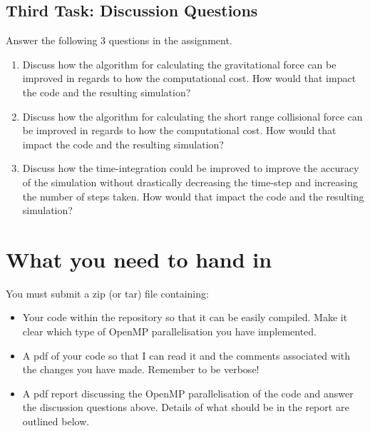 \documentclass[11pt]{amsart}
\begin{document}
\subsection{{\color{Red}Third Task}: Discussion Questions\nopunct\\}\label{sec:tasks:discussion}
Answer the following 3 questions in the assignment.
\begin{enumerate} 
  \item Discuss how the algorithm for calculating the gravitational force can be improved in regards to how the computational cost. How would that impact the code and the resulting simulation?
  \item Discuss how the algorithm for calculating the short range collisional force can be improved in regards to how the computational cost. How would that impact the code and the resulting simulation?
  \item Discuss how the time-integration could be improved to improve the accuracy of the simulation without drastically decreasing the time-step and increasing the number of steps taken. How would that impact the code and the resulting simulation? 
\end{enumerate}

\section{{\color{Blue}What you need to hand in\nopunct\\}}\label{sec:handin}

You must submit a zip (or tar) file containing:
\begin{itemize}
  \item Your code within the repository so that it can be easily compiled. Make it clear which type of OpenMP parallelisation you have implemented.
  \item A pdf of your code so that I can read it and the comments associated with the changes you have made. Remember to be verbose!
  \item A pdf report discussing the OpenMP parallelisation of the code and answer the discussion questions above. Details of what should be in the report are outlined below.
\end{itemize}
\end{document}
